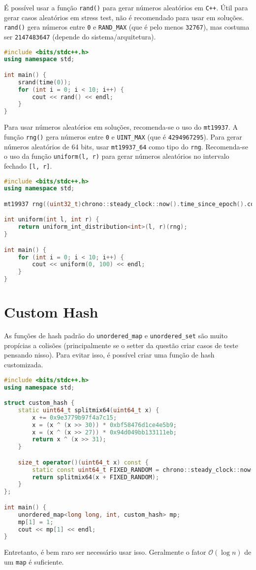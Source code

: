 É possível usar a função \texttt{rand()} para gerar números aleatórios em \texttt{C++}.
Útil para gerar casos aleatórios em stress test, não é recomendado para usar em soluções.
\texttt{rand()} gera números entre \texttt{0} e \texttt{RAND\_MAX} (que é pelo menos \texttt{32767}), mas costuma ser \texttt{2147483647} (depende do sistema/arquitetura).

\begin{lstlisting}[language=C++]
#include <bits/stdc++.h>
using namespace std;

int main() {
    srand(time(0));
    for (int i = 0; i < 10; i++) {
        cout << rand() << endl;
    }
}

\end{lstlisting}

Para usar números aleatórios em soluções, recomenda-se o uso do \texttt{mt19937}.
A função \texttt{rng()} gera números entre \texttt{0} e \texttt{UINT\_MAX} (que é \texttt{4294967295}).
Para gerar números aleatórios de 64 bits, usar \texttt{mt19937\_64} como tipo do \texttt{rng}.
Recomenda-se o uso da função \texttt{uniform(l, r)} para gerar números aleatórios no intervalo fechado \texttt{[l, r]}.

\begin{lstlisting}[language=C++]
#include <bits/stdc++.h>
using namespace std;

mt19937 rng((uint32_t)chrono::steady_clock::now().time_since_epoch().count());

int uniform(int l, int r) {
    return uniform_int_distribution<int>(l, r)(rng);
}

int main() {
    for (int i = 0; i < 10; i++) {
        cout << uniform(0, 100) << endl;
    }
}

\end{lstlisting}

\section{Custom Hash}

As funções de hash padrão do \texttt{unordered\_map} e \texttt{unordered\_set} são muito propícias a colisões (principalmente se o setter da questão criar casos de teste pensando nisso).
Para evitar isso, é possível criar uma função de hash customizada.

\begin{lstlisting}[language=C++]
#include <bits/stdc++.h>
using namespace std;

struct custom_hash {
    static uint64_t splitmix64(uint64_t x) {
        x += 0x9e3779b97f4a7c15;
        x = (x ^ (x >> 30)) * 0xbf58476d1ce4e5b9;
        x = (x ^ (x >> 27)) * 0x94d049bb133111eb;
        return x ^ (x >> 31);
    }

    size_t operator()(uint64_t x) const {
        static const uint64_t FIXED_RANDOM = chrono::steady_clock::now().time_since_epoch().count();
        return splitmix64(x + FIXED_RANDOM);
    }
};

int main() {
    unordered_map<long long, int, custom_hash> mp;
    mp[1] = 1;
    cout << mp[1] << endl;
}
\end{lstlisting}

Entretanto, é bem raro ser necessário usar isso. Geralmente o fator $\mathcal{O}(\log n)$ de um \texttt{map} é suficiente.